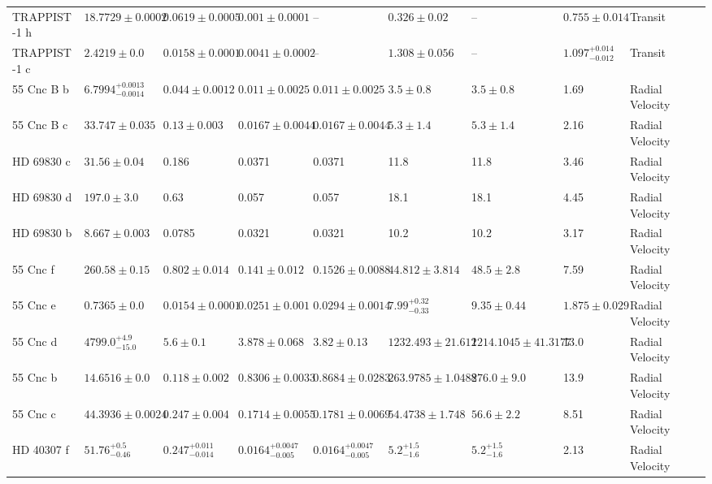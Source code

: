 \begin{tabular}{llllllllll}
TRAPPIST-1 h & $18.7729 \pm 0.0002$ & $0.0619 \pm 0.0005$ & $0.001 \pm 0.0001$ & -- & $0.326 \pm 0.02$ & -- & $0.755 \pm 0.014$ & Transit & \cite{AGOL_ET_AL__2021} \\
TRAPPIST-1 c & $2.4219 \pm 0.0$ & $0.0158 \pm 0.0001$ & $0.0041 \pm 0.0002$ & -- & $1.308 \pm 0.056$ & -- & $1.097^{+0.014}_{-0.012}$ & Transit & \cite{AGOL_ET_AL__2021} \\
55 Cnc B b & $6.7994^{+0.0013}_{-0.0014}$ & $0.044 \pm 0.0012$ & $0.011 \pm 0.0025$ & $0.011 \pm 0.0025$ & $3.5 \pm 0.8$ & $3.5 \pm 0.8$ & 1.69 & Radial Velocity & \cite{MOUTOU_ET_AL_2026} \\
55 Cnc B c & $33.747 \pm 0.035$ & $0.13 \pm 0.003$ & $0.0167 \pm 0.0044$ & $0.0167 \pm 0.0044$ & $5.3 \pm 1.4$ & $5.3 \pm 1.4$ & 2.16 & Radial Velocity & \cite{MOUTOU_ET_AL_2026} \\
HD 69830 c & $31.56 \pm 0.04$ & 0.186 & 0.0371 & 0.0371 & 11.8 & 11.8 & 3.46 & Radial Velocity & \cite{LOVIS_ET_AL__2006} \\
HD 69830 d & $197.0 \pm 3.0$ & 0.63 & 0.057 & 0.057 & 18.1 & 18.1 & 4.45 & Radial Velocity & \cite{LOVIS_ET_AL__2006} \\
HD 69830 b & $8.667 \pm 0.003$ & 0.0785 & 0.0321 & 0.0321 & 10.2 & 10.2 & 3.17 & Radial Velocity & \cite{LOVIS_ET_AL__2006} \\
55 Cnc f & $260.58 \pm 0.15$ & $0.802 \pm 0.014$ & $0.141 \pm 0.012$ & $0.1526 \pm 0.0088$ & $44.812 \pm 3.814$ & $48.5 \pm 2.8$ & 7.59 & Radial Velocity & \cite{MOUTOU_ET_AL_2026} \\
55 Cnc e & $0.7365 \pm 0.0$ & $0.0154 \pm 0.0001$ & $0.0251 \pm 0.001$ & $0.0294 \pm 0.0014$ & $7.99^{+0.32}_{-0.33}$ & $9.35 \pm 0.44$ & $1.875 \pm 0.029$ & Radial Velocity & \cite{BOURRIER_ET_AL__2018} \\
55 Cnc d & $4799.0^{+4.9}_{-15.0}$ & $5.6 \pm 0.1$ & $3.878 \pm 0.068$ & $3.82 \pm 0.13$ & $1232.493 \pm 21.612$ & $1214.1045 \pm 41.3177$ & 13.0 & Radial Velocity & \cite{MOUTOU_ET_AL_2026} \\
55 Cnc b & $14.6516 \pm 0.0$ & $0.118 \pm 0.002$ & $0.8306 \pm 0.0033$ & $0.8684 \pm 0.0283$ & $263.9785 \pm 1.0488$ & $276.0 \pm 9.0$ & 13.9 & Radial Velocity & \cite{MOUTOU_ET_AL_2026} \\
55 Cnc c & $44.3936 \pm 0.0024$ & $0.247 \pm 0.004$ & $0.1714 \pm 0.0055$ & $0.1781 \pm 0.0069$ & $54.4738 \pm 1.748$ & $56.6 \pm 2.2$ & 8.51 & Radial Velocity & \cite{MOUTOU_ET_AL_2026} \\
HD 40307 f & $51.76^{+0.5}_{-0.46}$ & $0.247^{+0.011}_{-0.014}$ & $0.0164^{+0.0047}_{-0.005}$ & $0.0164^{+0.0047}_{-0.005}$ & $5.2^{+1.5}_{-1.6}$ & $5.2^{+1.5}_{-1.6}$ & 2.13 & Radial Velocity & \cite{TUOMI_ET_AL__2013} \\

\end{tabular}
